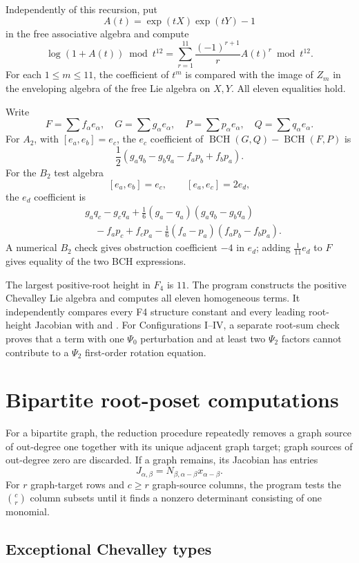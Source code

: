 \documentclass[11pt]{amsart}
\newcommand{\code}[1]{\texttt{\detokenize{#1}}}
\begin{document}
Independently of this recursion, put
\[
A(t)=\exp(tX)\exp(tY)-1
\]
in the free associative algebra and compute
\[
\log(1+A(t))\bmod t^{12}
=\sum_{r=1}^{11}\frac{(-1)^{r+1}}rA(t)^r\bmod t^{12}.
\]
For each $1\le m\le11$, the coefficient of $t^m$ is compared with the image of
$Z_m$ in the enveloping algebra of the free Lie algebra on $X,Y$.  All eleven
equalities hold.

Write
\[
F=\sum f_\alpha e_\alpha,\quad
G=\sum g_\alpha e_\alpha,\quad
P=\sum p_\alpha e_\alpha,\quad
Q=\sum q_\alpha e_\alpha.
\]
For $A_2$, with $[e_a,e_b]=e_c$, the $e_c$ coefficient of
\(\operatorname{BCH}(G,Q)-\operatorname{BCH}(F,P)\) is
\[
\frac12(g_aq_b-g_bq_a-f_ap_b+f_bp_a).
\]
For the $B_2$ test algebra
\[
[e_a,e_b]=e_c,\qquad[e_a,e_c]=2e_d,
\]
the $e_d$ coefficient is
\[
\begin{aligned}
&g_aq_c-g_cq_a
+\frac16(g_a-q_a)(g_aq_b-g_bq_a)\\
&\quad-f_ap_c+f_cp_a
-\frac16(f_a-p_a)(f_ap_b-f_bp_a).
\end{aligned}
\]
A numerical $B_2$ check gives obstruction coefficient $-4$ in $e_d$; adding
$\frac1{11}e_d$ to $F$ gives equality of the two BCH expressions.

The largest positive-root height in $F_4$ is $11$.  The program constructs the
positive Chevalley Lie algebra and computes all eleven homogeneous terms.
It independently compares every F4 structure constant and every leading
root-height Jacobian with \code{roots.py} and \code{algebra.py}.  For Configurations
I--IV, a separate root-sum check proves that a term with one $\Psi_0$
perturbation and at least two $\Psi_2$ factors cannot contribute to a
$\Psi_2$ first-order rotation equation.

\section{Bipartite root-poset computations}
\label{sec:root-posets}

For a bipartite graph, the reduction procedure repeatedly removes a graph
source of out-degree one together with its unique adjacent graph target;
graph sources of out-degree zero are discarded.  If a graph remains, its
Jacobian has entries
\[
J_{\alpha,\beta}=N_{\beta,\alpha-\beta}x_{\alpha-\beta}.
\]
For $r$ graph-target rows and $c\ge r$ graph-source columns, the program tests
the $\binom cr$ column subsets until it finds a nonzero determinant consisting
of one monomial.

\subsection{Exceptional Chevalley types}
\end{document}

